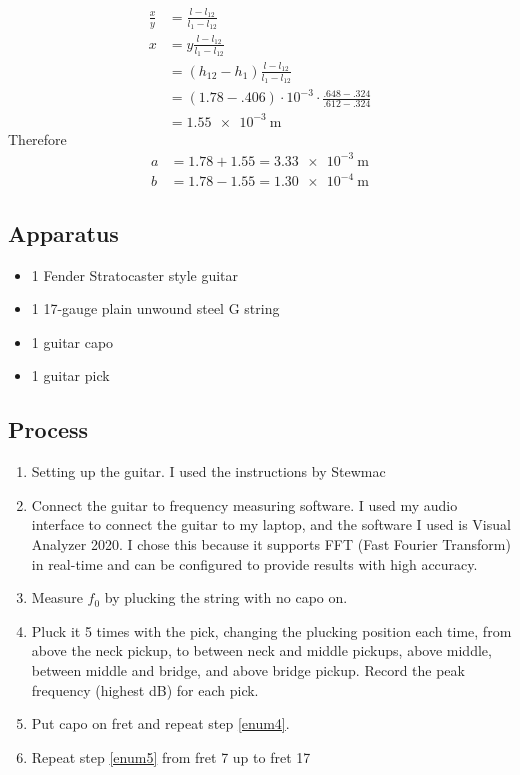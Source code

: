 \documentclass[11pt]{article}
\begin{document}
\begin{flushleft}
\begin{itemize}
\begin{align*}
                    \frac{x}{y} &= \frac{l-l_{12}}{l_1-l_{12}} \\
                    x &= y\frac{l-l_{12}}{l_1-l_{12}} \\
                    &= (h_{12}-h_1)\frac{l-l_{12}}{l_1-l_{12}} \\
                    &= (1.78-.406) \cdot 10^{-3} \cdot \frac{.648-.324}{.612-.324} \\
                    &= \SI{1.55e-3}{\meter}
                \end{align*}
                Therefore
                \begin{align*}
                    a &= 1.78 + 1.55 = \SI{3.33e-3}{\meter} \\
                    b &= 1.78 - 1.55 = \SI{1.30e-4}{\meter}
                \end{align*}    
            \end{itemize}
        \subsection{Apparatus}
            \begin{itemize}
                \item 1 Fender Stratocaster style guitar
                \item 1 17-gauge plain unwound steel G string
                \item 1 guitar capo 
                \item 1 guitar pick
            \end{itemize}
        \subsection{Process}
            \begin{enumerate}
                \item Setting up the guitar. I used the instructions by Stewmac %
                \item Connect the guitar to frequency measuring software. I used my audio interface to connect the guitar to my laptop, and the software I used is Visual Analyzer 2020. I chose this because it supports FFT (Fast Fourier Transform) in real-time and can be configured to provide results with high accuracy. 
                \item Measure $f_0$ by plucking the string with no capo on.
                \item Pluck it 5 times with the pick, changing the plucking position each time, from above the neck pickup, to between neck and middle pickups, above middle, between middle and bridge, and above bridge pickup. Record the peak frequency (highest dB) for each pick. \label{enum4}
                \item Put capo on  fret and repeat step \ref{enum4}. \label{enum5}
                \item Repeat step \ref{enum5} from fret 7 up to fret 17
            \end{enumerate}
        
        
    \end{flushleft}
\end{document}
